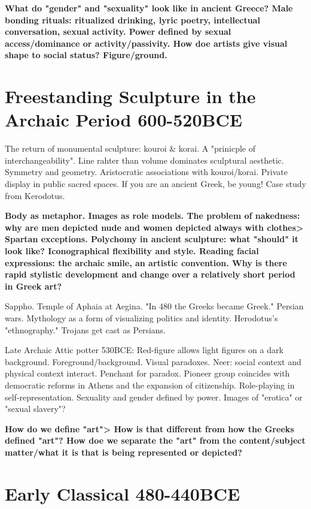 \documentclass[10pt]{armath}
\begin{document}
\begin{multicols}{2}
\textbf{What do "gender" and "sexuality" look like in ancient Greece? Male
bonding rituals: ritualized drinking, lyric poetry, intellectual conversation,
sexual activity. Power defined by sexual access/dominance or
activity/passivity. How doe artists give visual shape to social status?
Figure/ground.} 

\section{Freestanding Sculpture in the Archaic Period 600-520BCE}%
\label{sec:freestanding_sculpture_in_the_archaic_period_600_520bce}

The return of monumental sculpture: kouroi \& korai. A "prinicple of
interchangeability". Line rahter than volume dominates sculptural aesthetic.
Symmetry and geometry. Aristocratic associations with kouroi/korai. Private
display in public sacred spaces. If you are an ancient Greek, be young! Case
study from Kerodotus.

\textbf{Body as metaphor. Images as role models. The problem of nakedness: why
are men depicted nude and women depicted always with clothes> Spartan
exceptions. Polychomy in ancient sculpture: what "should" it look like?
Iconographical flexibility and style. Reading facial expressions: the archaic
smile, an artistic convention. Why is there rapid stylistic development and
change over a relatively short period in Greek art?} 

Sappho. Temple of Aphaia at Aegina. "In 480 the Greeks became Greek." Persian
wars. Mythology as a form of visualizing politics and identity. Herodotus's
"ethnography." Trojans get cast as Persians.

Late Archaic Attic potter 530BCE: Red-figure allows light figures on a dark
background. Foreground/background. Visual paradoxes. Neer: social context and
physical context interact. Penchant for paradox. Pioneer group coincides with
democratic reforms in Athens and the expansion of citizenship. Role-playing in
self-representation. Sexuality and gender defined by power. Images of "erotica"
or "sexual slavery"?

\textbf{How do we define "art"> How is that different from how the Greeks
defined "art"? How doe we separate the "art" from the content/subject
matter/what it is that is being represented or depicted?} 

\section{Early Classical 480-440BCE}%
\label{sec:early_classical_480_440bce}


\end{multicols}
\end{document}
